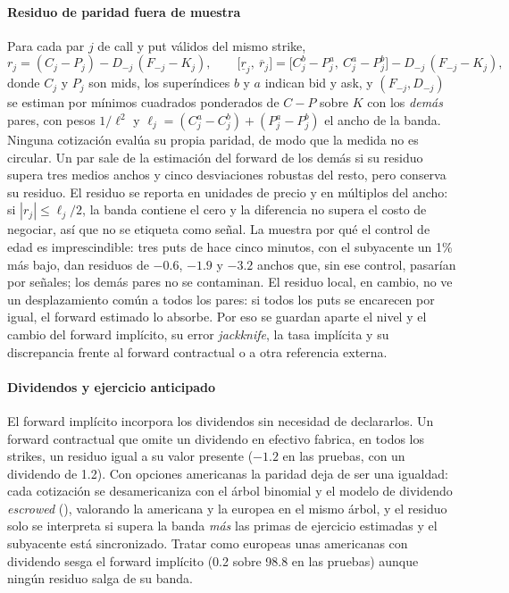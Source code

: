\paragraph{Residuo de paridad fuera de muestra} Para cada par $j$ de call y put válidos del mismo strike,
\begin{equation}
r_j=(C_j-P_j)-D_{-j}\,(F_{-j}-K_j),\qquad
\bigl[\underline r_j,\ \overline r_j\bigr]=\bigl[C^{b}_j-P^{a}_j,\ C^{a}_j-P^{b}_j\bigr]-D_{-j}\,(F_{-j}-K_j),
\label{eq:residuo_paridad}
\end{equation}
donde $C_j$ y $P_j$ son mids, los superíndices $b$ y $a$ indican bid y ask, y $(F_{-j},D_{-j})$ se estiman
por mínimos cuadrados ponderados de $C-P$ sobre $K$ con los \emph{demás} pares, con pesos $1/\ell^2$ y
$\ell_j=(C^a_j-C^b_j)+(P^a_j-P^b_j)$ el ancho de la banda. Ninguna cotización evalúa su propia paridad, de
modo que la medida no es circular. Un par sale de la estimación del forward de los demás si su residuo
supera tres medios anchos y cinco desviaciones robustas del resto, pero conserva su residuo. El residuo se
reporta en unidades de precio y en múltiplos del ancho: si $|r_j|\le\ell_j/2$, la banda contiene el cero y
la diferencia no supera el costo de negociar, así que no se etiqueta como señal. La
 muestra por qué el control de edad es imprescindible: tres puts de hace
cinco minutos, con el subyacente un 1\% más bajo, dan residuos de $-0.6$, $-1.9$ y $-3.2$ anchos que,
sin ese control, pasarían por señales; los demás pares no se contaminan. El residuo local, en cambio, no
ve un desplazamiento común a todos los pares: si todos los puts se encarecen por igual, el forward
estimado lo absorbe. Por eso se guardan aparte el nivel y el cambio del forward implícito, su error
\emph{jackknife}, la tasa implícita y su discrepancia frente al forward contractual o a otra referencia
externa.


\paragraph{Dividendos y ejercicio anticipado} El forward implícito incorpora los dividendos sin necesidad
de declararlos. Un forward contractual que omite un dividendo en efectivo fabrica, en todos los strikes, un
residuo igual a su valor presente ($-1.2$ en las pruebas, con un dividendo de 1.2). Con opciones americanas
la paridad deja de ser una igualdad: cada cotización se desamericaniza con el árbol binomial y el modelo de
dividendo \emph{escrowed} (), valorando la americana y la europea en el mismo
árbol, y el residuo solo se interpreta si supera la banda \emph{más} las primas de ejercicio estimadas y
el subyacente está sincronizado. Tratar como europeas unas americanas con dividendo sesga el forward
implícito (0.2 sobre 98.8 en las pruebas) aunque ningún residuo salga de su banda.

